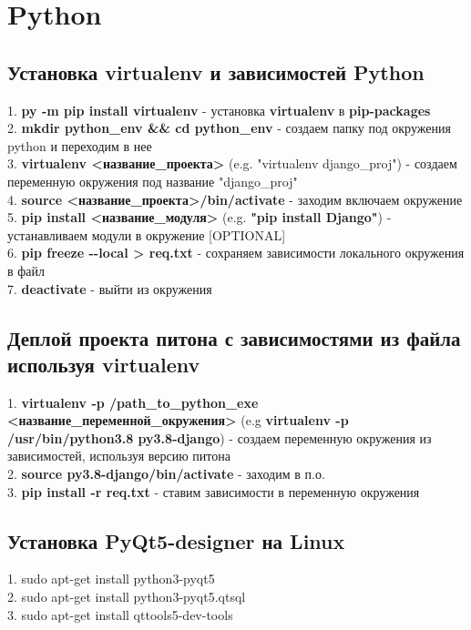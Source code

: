 \documentclass[a4paper, 12px]{article}
\begin{document}
\section{Python}

\subsection{Установка virtualenv и зависимостей Python} 
1. \textbf{py -m pip install virtualenv} - установка \textbf{virtualenv} в \textbf{pip-packages} \\
2. \textbf{mkdir python\_env \&\& cd python\_env} - создаем папку под окружения python и переходим в нее \\
3. \textbf{virtualenv <название\_проекта>} (e.g. "virtualenv django\_proj") - создаем переменную окружения под название "django\_proj"\\
4. \textbf{source <название\_проекта>/bin/activate} - заходим включаем окружение\\
5. \textbf{pip install <название\_модуля>} (e.g. \textbf{"pip install Django"}) - устанавливаем модули в окружение [OPTIONAL]\\
6. \textbf{pip freeze -\--local > req.txt} - сохраняем зависимости локального окружения в файл\\
7. \textbf{deactivate} - выйти из окружения
\subsection{Деплой проекта питона с зависимостями из файла используя virtualenv}
1. \textbf{virtualenv -p /path\_to\_python\_exe <название\_переменной\_окружения>} (e.g \textbf{virtualenv -p /usr/bin/python3.8 py3.8-django}) - создаем переменную окружения из зависимостей, используя версию питона \\
2. \textbf{source py3.8-django/bin/activate} - заходим в п.о. \\
3. \textbf{pip install -r req.txt} - ставим зависимости в переменную окружения
\subsection{Установка PyQt5-designer на Linux} 
1. sudo apt-get install python3-pyqt5 \\
2. sudo apt-get install python3-pyqt5.qtsql\\
3. sudo apt-get install qttools5-dev-tools
\end{document}
